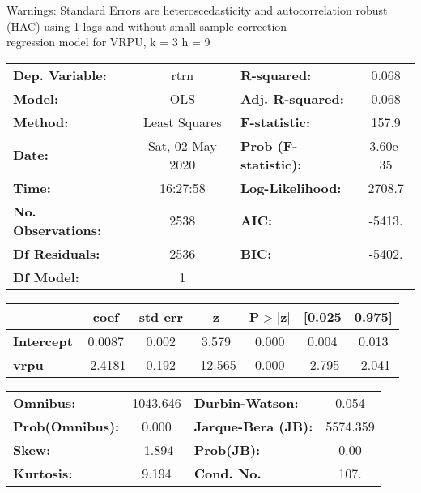 Warnings: \newline
 [1] Standard Errors are heteroscedasticity and autocorrelation robust (HAC) using 1 lags and without small sample correction\\ 

regression model for VRPU, k = 3 h = 9\begin{center}
\begin{tabular}{lclc}
\toprule
\textbf{Dep. Variable:}    &       rtrn       & \textbf{  R-squared:         } &     0.068   \\
\textbf{Model:}            &       OLS        & \textbf{  Adj. R-squared:    } &     0.068   \\
\textbf{Method:}           &  Least Squares   & \textbf{  F-statistic:       } &     157.9   \\
\textbf{Date:}             & Sat, 02 May 2020 & \textbf{  Prob (F-statistic):} &  3.60e-35   \\
\textbf{Time:}             &     16:27:58     & \textbf{  Log-Likelihood:    } &    2708.7   \\
\textbf{No. Observations:} &        2538      & \textbf{  AIC:               } &    -5413.   \\
\textbf{Df Residuals:}     &        2536      & \textbf{  BIC:               } &    -5402.   \\
\textbf{Df Model:}         &           1      & \textbf{                     } &             \\
\bottomrule
\end{tabular}
\begin{tabular}{lcccccc}
                   & \textbf{coef} & \textbf{std err} & \textbf{z} & \textbf{P$> |$z$|$} & \textbf{[0.025} & \textbf{0.975]}  \\
\midrule
\textbf{Intercept} &       0.0087  &        0.002     &     3.579  &         0.000        &        0.004    &        0.013     \\
\textbf{vrpu}      &      -2.4181  &        0.192     &   -12.565  &         0.000        &       -2.795    &       -2.041     \\
\bottomrule
\end{tabular}
\begin{tabular}{lclc}
\textbf{Omnibus:}       & 1043.646 & \textbf{  Durbin-Watson:     } &    0.054  \\
\textbf{Prob(Omnibus):} &   0.000  & \textbf{  Jarque-Bera (JB):  } & 5574.359  \\
\textbf{Skew:}          &  -1.894  & \textbf{  Prob(JB):          } &     0.00  \\
\textbf{Kurtosis:}      &   9.194  & \textbf{  Cond. No.          } &     107.  \\
\bottomrule
\end{tabular}
\end{center}

